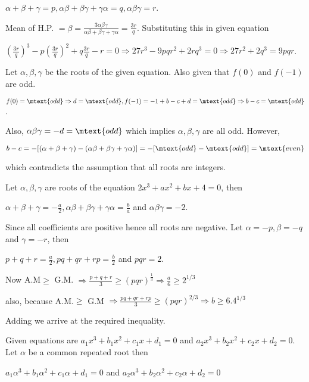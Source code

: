   $\alpha + \beta + \gamma = p, \alpha\beta + \beta\gamma + \gamma\alpha = q, \alpha\beta\gamma = r$.

  Mean of H.P. $= \beta = \frac{3\alpha\beta\gamma}{\alpha\beta + \beta\gamma + \gamma\alpha} =
  \frac{3r}{q}$. Substituting this in given equation

  $\left(\frac{3r}{q}\right)^3 - p\left(\frac{3r}{q}\right)^2 + q\frac{3r}{q} - r = 0 \Rightarrow 27r^3 -
  9pqr^2 + 2rq^3 = 0 \Rightarrow 27r^2 + 2q^3 = 9pqr$.
\item Let $\alpha, \beta, \gamma$ be the roots of the given equation. Also given that $f(0)$ and $f(-1)$ are
  odd.

  $f(0) = \mtext{odd} \Rightarrow d = \mtext{odd}, f(-1) = -1 + b - c + d = \mtext{odd} \Rightarrow b - c =
  \mtext{odd}$.

  Also, $\alpha\beta\gamma = -d = \mtext{odd}$ which implies $\alpha, \beta, \gamma$ are all odd. However,

  $b - c = -[(\alpha + \beta + \gamma) - (\alpha\beta + \beta\gamma + \gamma\alpha)] = -[\mtext{odd} -
    \mtext{odd}] = \mtext{even}$

  which contradicts the assumption that all roots are integers.
\item Let $\alpha, \beta, \gamma$ are roots of the equation $2x^3 + ax^2 + bx + 4 = 0$, then

  $\alpha + \beta + \gamma = -\frac{a}{2}, \alpha\beta + \beta\gamma + \gamma\alpha = \frac{b}{a}$ and
  $\alpha\beta\gamma = -2$.

  Since all coefficients are positive hence all roots are negative. Let $\alpha = -p, \beta = -q$ and
  $\gamma = -r$, then

  $p + q + r = \frac{a}{2}, pq + qr + rp = \frac{b}{2}$ and $pqr = 2$.

  Now A.M$\geq$ G.M. $\Rightarrow \frac{p + q + r}{3}\geq (pqr)^{\frac{1}{3}}\Rightarrow \frac{a}{6}\geq
  2^{1/3}$

  also, because A.M.$\geq$ G.M $\Rightarrow \frac{pq + qr + rp}{3}\geq (pqr)^{2/3} \Rightarrow b\geq
  6.4^{1/3}$

  Adding we arrive at the required inequality.
\item Given equations are $a_1x^3 + b_1x^2 + c_1x + d_1 = 0$ and $a_2x^3 + b_2x^2 + c_2x + d_2 = 0$. Let
  $\alpha$ be a common repeated root then

  $a_1\alpha^3 + b_1\alpha^2 + c_1\alpha + d_1 = 0$ and $a_2\alpha^3 + b_2\alpha^2 + c_2\alpha + d_2 = 0$

